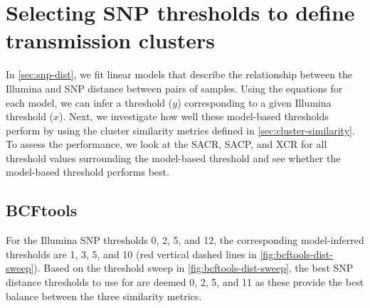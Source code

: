 
\section{Selecting \ont{} SNP thresholds to define transmission clusters}
\label{app:dist-sweep}

In \autoref{sec:snp-dist}, we fit linear models that describe the relationship between the Illumina and \ont{} SNP distance between pairs of samples. Using the equations for each model, we can infer a \ont{} threshold ($y$) corresponding to a given Illumina threshold ($x$). Next, we investigate how well these model-based thresholds perform by using the cluster similarity metrics defined in \autoref{sec:cluster-similarity}. To assess the performance, we look at the SACR, SACP, and XCR for all threshold values surrounding the model-based threshold and see whether the model-based threshold performs best.

\subsection{BCFtools}
\label{app:dist-sweep-bcftools}

For the Illumina SNP thresholds 0, 2, 5, and 12, the corresponding \bcftools{} model-inferred thresholds are 1, 3, 5, and 10 (red vertical dashed lines in \autoref{fig:bcftools-dist-sweep}). Based on the threshold sweep in \autoref{fig:bcftools-dist-sweep}, the best SNP distance thresholds to use for \bcftools{} are deemed 0, 2, 5, and 11 as these provide the best balance between the three similarity metrics.

